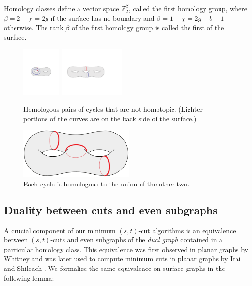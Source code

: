 \documentclass[letterpaper,review]{siamart190516}
\def\Z{\mathbb{Z}}
\begin{document}
Homology classes define a vector space $\Z_2^\beta$, called the first homology group, where $\beta = 2-\chi = 2g$ if the surface has no boundary and $\beta = 1-\chi = 2g+b-1$ otherwise.  The rank $\beta$ of the first homology group is called the first  of the surface.

\begin{figure}[htb]
\centering
\includegraphics[height=1in]{Fig/homologous3}\qquad
\includegraphics[height=1in]{Fig/homologous2}
\caption{Homologous pairs of cycles that are not homotopic.  (Lighter portions of the curves are on the back side of the surface.)}
\label{fig:homology}
\end{figure}

\begin{figure}[htb]
\centering
\includegraphics[height=1in]{Fig/homologous1}
\caption{Each cycle is homologous to the union of the other two.}
\label{fig:homology2}
\end{figure}


\subsection{Duality between cuts and even subgraphs}
\label{SS:duality}


A crucial component of our minimum $(s,t)$-cut algorithms is an equivalence between $(s,t)$-cuts and even subgraphs of the \emph{dual graph} contained in a particular homology class.  This equivalence was first observed in planar graphs by Whitney \cite{w-pg-33} and was later used to compute minimum cuts in planar graphs by Itai and Shiloach \cite{is-mfpn-79}.
We formalize the same equivalence on surface graphs in the following lemma:
\end{document}
